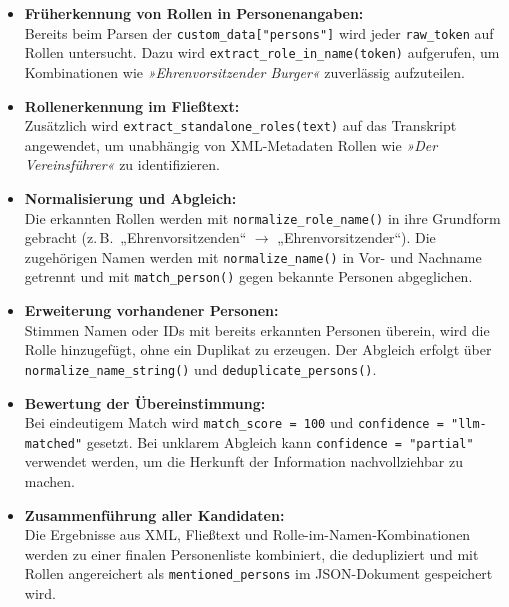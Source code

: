 \documentclass{article}
\begin{document}
\begin{itemize}
    \item \textbf{Früherkennung von Rollen in Personenangaben:} \\ Bereits beim Parsen der \texttt{custom\_data["persons"]} wird jeder \texttt{raw\_token} auf Rollen untersucht. Dazu wird \texttt{extract\_role\_in\_name(token)} aufgerufen, um Kombinationen wie \textit{»Ehrenvorsitzender Burger«} zuverlässig aufzuteilen.

    \item \textbf{Rollenerkennung im Fließtext:} \\Zusätzlich wird \texttt{extract\_standalone\_roles(text)} auf das Transkript angewendet, um unabhängig von XML-Metadaten Rollen wie \textit{»Der Vereinsführer«} zu identifizieren.

    \item \textbf{Normalisierung und Abgleich:} \\Die erkannten Rollen werden mit \texttt{normalize\_role\_name()} in ihre Grundform gebracht (z.\,B.\ „Ehrenvorsitzenden“ $\rightarrow$ „Ehrenvorsitzender“). Die zugehörigen Namen werden mit \texttt{normalize\_name()} in Vor- und Nachname getrennt und mit \texttt{match\_person()} gegen bekannte Personen abgeglichen.

    \item \textbf{Erweiterung vorhandener Personen:} \\Stimmen Namen oder IDs mit bereits erkannten Personen überein, wird die Rolle hinzugefügt, ohne ein Duplikat zu erzeugen. Der Abgleich erfolgt über \texttt{normalize\_name\_string()} und \texttt{deduplicate\_persons()}.

    \item \textbf{Bewertung der Übereinstimmung:} \\Bei eindeutigem Match wird \texttt{match\_score = 100} und \texttt{confidence = "llm-matched"} gesetzt. Bei unklarem Abgleich kann \texttt{confidence = "partial"} verwendet werden, um die Herkunft der Information nachvollziehbar zu machen.

    \item \textbf{Zusammenführung aller Kandidaten:} \\Die Ergebnisse aus XML, Fließtext und Rolle-im-Namen-Kombinationen werden zu einer finalen Personenliste kombiniert, die dedupliziert und mit Rollen angereichert als \texttt{mentioned\_persons} im JSON-Dokument gespeichert wird.
\end{itemize}
\end{document}
